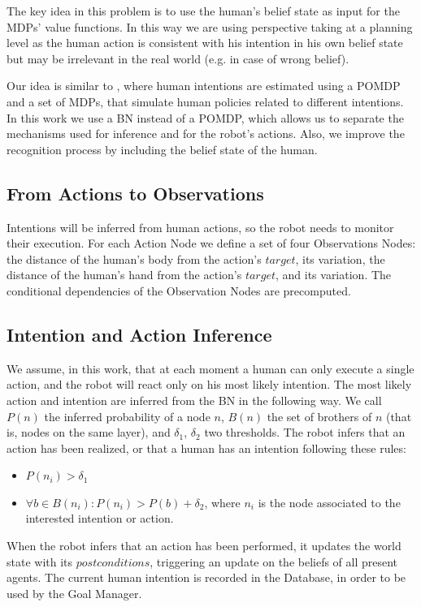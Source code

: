 The key idea in this problem is to use the human's belief state as input for the MDPs' value functions. In this way we are using perspective taking at a planning level as the human action is consistent with his intention in his own belief state but may be irrelevant in the real world (e.g. in case of wrong belief).

Our idea is similar to \cite{karami2010human}, where human intentions are estimated using a POMDP and a set of MDPs, that simulate human policies related to different intentions. In this work we use a BN instead of a POMDP, which allows us to separate the mechanisms used for inference and for the robot's actions. Also, we improve the recognition process by including the belief state of the human.

\subsection{From Actions to Observations}
Intentions will be inferred from human actions, so the robot needs to monitor their execution. For each Action Node we define a set of four Observations Nodes: the distance of the human's body from the action's $target$, its variation, the distance of the human's hand from the action's $target$, and its variation. The conditional dependencies of the Observation Nodes are precomputed.

\subsection{Intention and Action Inference}
\label{sec:situation_assessment-intention and action inference}
We assume, in this work, that at each moment a human can only execute a single action, and the robot will react only on his most likely intention. The most likely action and intention are inferred from the BN in the following way. We call $P(n)$ the inferred probability of a node $n$, $B(n)$ the set of brothers of $n$ (that is, nodes on the same layer), and $\delta_1$, $\delta_2$ two thresholds. The robot infers that an action has been realized, or that a human has an intention following these rules: 
\begin{itemize}
\item  \(P(n_i)>\delta_1\) 
\item  \(\forall b \in B(n_i): P(n_i)>P(b)+\delta_2\), where $n_i$ is the node associated to the interested intention or action.
\end{itemize}

When the robot infers that an action has been performed, it updates the world state with its $postconditions$, triggering an update on the beliefs of all present agents. The current human intention is recorded in the Database, in order to be used by the Goal Manager.

